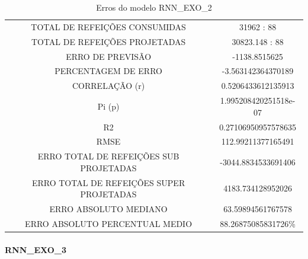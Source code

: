 \documentclass[	12pt, Times, openright, twoside, a4paper, english, brazil]{abntex2}
\begin{document}
                \begin{table}[!ht]
                \centering
                \caption{Erros do modelo  RNN\_EXO\_2 } 
                    \begin{tabular}{|c|c|}
                    \rowcolor{gray!50}
                    \hline
                \multicolumn{2}{c}{RNN\_EXO\_2:} \\ \hline
                TOTAL DE REFEIÇÕES CONSUMIDAS & 31962 : 88 \\
                TOTAL DE REFEIÇÕES PROJETADAS & 30823.148 : 88 \\
                ERRO DE PREVISÃO & -1138.8515625 \\
                PERCENTAGEM DE ERRO &  -3.563142364370189 \\
                CORRELAÇÃO (r)& 0.5206433612135913\\ Pi (p) & 1.995208420251518e-07\\
                R2 & 0.27106950957578635\\
                RMSE & 112.99211377165491\\
                ERRO TOTAL DE REFEIÇÕES SUB PROJETADAS & -3044.8834533691406\\
                ERRO TOTAL DE REFEIÇÕES SUPER PROJETADAS & 4183.734128952026\\
                ERRO ABSOLUTO MEDIANO & 63.59894561767578\\
                ERRO ABSOLUTO PERCENTUAL MEDIO & 88.26875085831726\% \\ \hline \end{tabular}\end{table}
                
              
              \paragraph{RNN\_EXO\_3}
                \begin{figure}[H]
                \end{figure}
\end{document}
